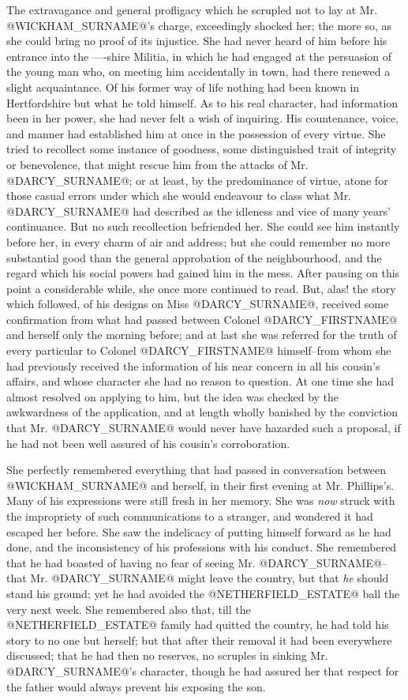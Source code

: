 The extravagance and general profligacy which he scrupled not to lay at
Mr. @WICKHAM_SURNAME@'s charge, exceedingly shocked her; the more so, as she could
bring no proof of its injustice. She had never heard of him before his
entrance into the ----shire Militia, in which he had engaged at the
persuasion of the young man who, on meeting him accidentally in town,
had there renewed a slight acquaintance. Of his former way of life
nothing had been known in Hertfordshire but what he told himself. As
to his real character, had information been in her power, she had
never felt a wish of inquiring. His countenance, voice, and manner had
established him at once in the possession of every virtue. She tried
to recollect some instance of goodness, some distinguished trait of
integrity or benevolence, that might rescue him from the attacks of
Mr. @DARCY_SURNAME@; or at least, by the predominance of virtue, atone for those
casual errors under which she would endeavour to class what Mr. @DARCY_SURNAME@
had described as the idleness and vice of many years' continuance. But
no such recollection befriended her. She could see him instantly before
her, in every charm of air and address; but she could remember no more
substantial good than the general approbation of the neighbourhood, and
the regard which his social powers had gained him in the mess. After
pausing on this point a considerable while, she once more continued to
read. But, alas! the story which followed, of his designs on Miss
@DARCY_SURNAME@, received some confirmation from what had passed between Colonel
@DARCY_FIRSTNAME@ and herself only the morning before; and at last she was
referred for the truth of every particular to Colonel @DARCY_FIRSTNAME@
himself--from whom she had previously received the information of his
near concern in all his cousin's affairs, and whose character she had no
reason to question. At one time she had almost resolved on applying to
him, but the idea was checked by the awkwardness of the application, and
at length wholly banished by the conviction that Mr. @DARCY_SURNAME@ would never
have hazarded such a proposal, if he had not been well assured of his
cousin's corroboration.

She perfectly remembered everything that had passed in conversation
between @WICKHAM_SURNAME@ and herself, in their first evening at Mr. Phillips's.
Many of his expressions were still fresh in her memory. She was \textit{now}
struck with the impropriety of such communications to a stranger, and
wondered it had escaped her before. She saw the indelicacy of putting
himself forward as he had done, and the inconsistency of his professions
with his conduct. She remembered that he had boasted of having no fear
of seeing Mr. @DARCY_SURNAME@--that Mr. @DARCY_SURNAME@ might leave the country, but that
\textit{he} should stand his ground; yet he had avoided the @NETHERFIELD_ESTATE@ ball
the very next week. She remembered also that, till the @NETHERFIELD_ESTATE@
family had quitted the country, he had told his story to no one but
herself; but that after their removal it had been everywhere discussed;
that he had then no reserves, no scruples in sinking Mr. @DARCY_SURNAME@'s
character, though he had assured her that respect for the father would
always prevent his exposing the son.

